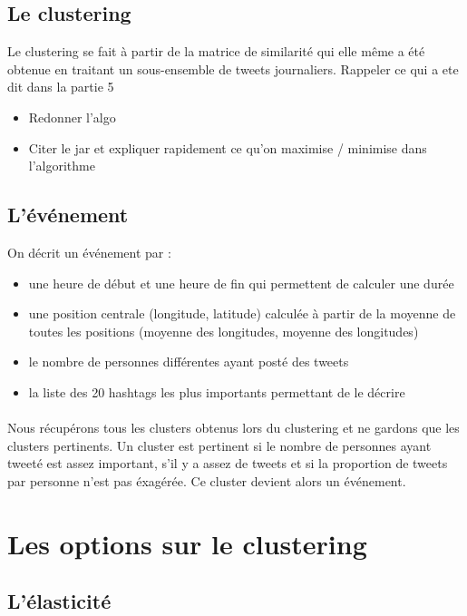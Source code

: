 \documentclass[12pt]{article}
\begin{document}
\subsection{Le clustering}
Le clustering se fait \`a partir de la matrice de similarit\'e qui elle m\^eme a \'et\'e obtenue en traitant 
un sous-ensemble de tweets journaliers.
\newline
Rappeler ce qui a ete dit dans la partie 5
\begin{itemize}
	\item Redonner l'algo
	\item Citer le jar et expliquer rapidement ce qu'on maximise / minimise dans l'algorithme
\end{itemize}

\subsection{L'\'ev\'enement}
On d\'ecrit un \'ev\'enement par :
\begin{itemize}
\item une heure de d\'ebut et une heure de fin qui permettent de calculer une dur\'ee
\item une position centrale (longitude, latitude) calcul\'ee \`a partir de la moyenne de toutes
les positions (moyenne des longitudes, moyenne des longitudes)
\item le nombre de personnes diff\'erentes ayant post\'e des tweets
\item la liste des 20 hashtags les plus importants permettant de le d\'ecrire
\end{itemize}
\paragraph{}
Nous r\'ecup\'erons tous les clusters obtenus lors du clustering et ne gardons que les clusters pertinents. 
Un cluster est pertinent si le nombre de personnes ayant tweet\'e est assez important, s'il y a assez de tweets et 
si la proportion de tweets par personne n'est pas \'exag\'er\'ee. Ce cluster devient alors un \'ev\'enement.

\newpage

\section{Les options sur le clustering}

\subsection{L'\'elasticit\'e}
\end{document}
